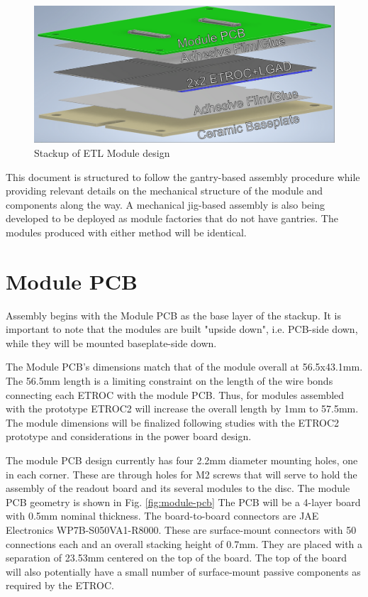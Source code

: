 \documentclass[10pt]{datasheet}
\begin{document}
\begin{figure}[h]
	\centering
	\includegraphics[width=\textwidth]{figures/overview.png}
	\caption{Stackup of ETL Module design}
	\label{fig:overview}
\end{figure}

This document is structured to follow the gantry-based assembly procedure while providing relevant details on the mechanical structure of the module and components along the way. A mechanical jig-based assembly is also being developed to be deployed as module factories that do not have gantries. The modules produced with either method will be identical.


\section{Module PCB}

Assembly begins with the Module PCB as the base layer of the stackup. It is important to note that the modules are built "upside down", i.e. PCB-side down, while they will be mounted baseplate-side down.

The Module PCB's dimensions match that of the module overall at 56.5x43.1mm.  The 56.5mm length is a limiting constraint on the length of the wire bonds connecting each ETROC with the module PCB.  Thus, for modules assembled with the prototype ETROC2 will increase the overall length by 1mm to 57.5mm.  The module dimensions will be finalized following studies with the ETROC2 prototype and considerations in the power board design.

The module PCB design currently has four 2.2mm diameter mounting holes, one in each corner. These are through holes for M2 screws that will serve to hold the assembly of the readout board and its several modules to the disc. The module PCB geometry is shown in Fig. \ref{fig:module-pcb} The PCB will be a 4-layer board with 0.5mm nominal thickness. The board-to-board connectors are JAE Electronics WP7B-S050VA1-R8000. These are surface-mount connectors with 50 connections each and an overall stacking height of 0.7mm. They are placed with a separation of 23.53mm centered on the top of the board. The top of the board will also potentially have a small number of surface-mount passive components as required by the ETROC.
\end{document}
